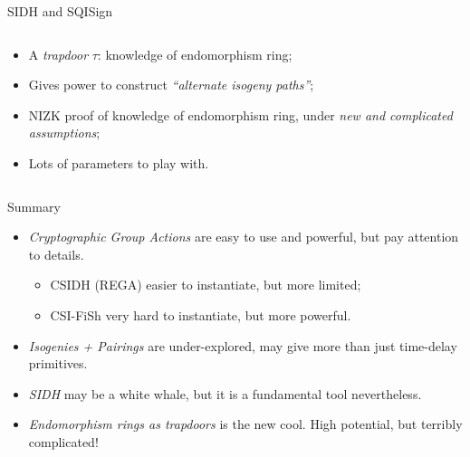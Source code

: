 \documentclass[aspectratio=169]{beamer}
\begin{document}
\begin{frame}{SIDH and SQISign}
\begin{columns}
\begin{column}{0.5\textwidth}
      \begin{itemize}
      \item A \emph{trapdoor} $\tau$: knowledge of endomorphism ring;
      \item Gives power to construct \emph{``alternate isogeny
          paths''};
      \item NIZK proof of knowledge of endomorphism ring, under
        \emph{new and complicated assumptions};
      \item Lots of parameters to play with.
      \end{itemize}
    \end{column}
  \end{columns}
\end{frame}


\begin{frame}{Summary}
  \begin{itemize}
  \item \emph{Cryptographic Group Actions} are easy to use and powerful, but
    pay attention to details.
    \begin{itemize}
    \item CSIDH (REGA) easier to instantiate, but more limited;
    \item CSI-FiSh very hard to instantiate, but more powerful.
    \end{itemize}
  \item \emph{Isogenies + Pairings} are under-explored, may give more
    than just time-delay primitives.
  \item \emph{SIDH} may be a white whale, but it is a fundamental tool
    nevertheless.
  \item \emph{Endomorphism rings as trapdoors} is the new
    cool.  High potential, but terribly complicated!
  \end{itemize}
\end{frame}


\begin{frame}[plain]
  \centering
\end{frame}

\end{document}
